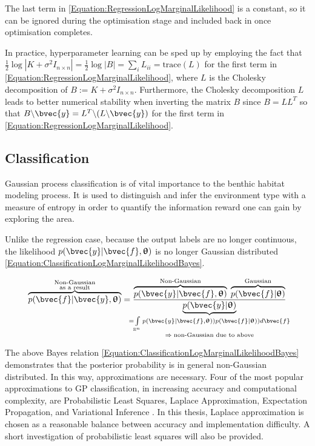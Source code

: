 				The last term in \eqref{Equation:RegressionLogMarginalLikelihood} is a constant, so it can be ignored during the optimisation stage and included back in once optimisation completes.
				
				In practice, hyperparameter learning can be sped up by employing the fact that $\frac{1}{2} \log|K + \sigma^{2} I_{n \times n}| = \frac{1}{2} \log|B| = \sum_{i} L_{ii} = \mathrm{trace}(L)$ for the first term in \eqref{Equation:RegressionLogMarginalLikelihood}, where $L$ is the Cholesky decomposition of $B := K + \sigma^{2} I_{n \times n}$. Furthermore, the Cholesky decomposition $L$ leads to better numerical stability when inverting the matrix $B$ since $B = LL^{T}$ so that $B \backslash \bvec{y} = L^{T} \backslash (L \backslash \bvec{y})$ for the first term in \eqref{Equation:RegressionLogMarginalLikelihood}.
				
		\subsection{Classification}
		\label{Background:GaussianProcesses:Classification}
		
			Gaussian process classification is of vital importance to the benthic habitat modeling process. It is used to distinguish and infer the environment type with a measure of entropy in order to quantify the information reward one can gain by exploring the area.
			
			Unlike the regression case, because the output labels are no longer continuous, the likelihood $p(\bvec{y} | \bvec{f}, \vec{\uptheta})$ is no longer Gaussian distributed \eqref{Equation:ClassificationLogMarginalLikelihoodBayes}.

			\begin{equation}
				\overbrace{p(\bvec{f} | \bvec{y}, \vec{\uptheta})}^{\mathclap{\substack{\text{Non-Gaussian} \\ \text{as a result}}}} = \frac{\overbrace{p(\bvec{y} | \bvec{f}, \vec{\uptheta})}^{\text{Non-Gaussian}} \; \overbrace{p(\bvec{f} | \vec{\uptheta})}^{\text{Gaussian}}}{\underbrace{p(\bvec{y} | \vec{\uptheta})}_{\mathclap{\substack{= \int\limits_{\mathbb{R}^{n}} p(\bvec{y} | \bvec{f}, \vec{\uptheta})) p(\bvec{f} | \vec{\uptheta})) d\bvec{f} \\ \Rightarrow \; \text{non-Gaussian due to above}}}}}
			\label{Equation:ClassificationLogMarginalLikelihoodBayes}
			\end{equation}

			The above Bayes relation \eqref{Equation:ClassificationLogMarginalLikelihoodBayes} demonstrates that the posterior probability is in general non-Gaussian distributed. In this way, approximations are necessary. Four of the most popular approximations to GP classification, in increasing accuracy and computational complexity, are Probabilistic Least Squares, Laplace Approximation, Expectation Propagation, and Variational Inference \citep{GaussianProcessForMachineLearning}. In this thesis, Laplace approximation is chosen as a reasonable balance between accuracy and implementation difficulty. A short investigation of probabilistic least squares will also be provided.
			
